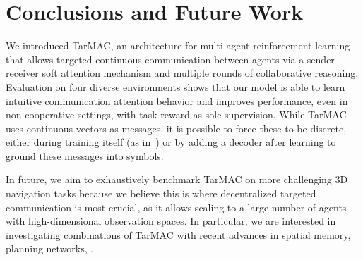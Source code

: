 \section{Conclusions and Future Work}
\label{sec:conclusions}
\vspace{1pt}

We introduced TarMAC, an architecture for multi-agent reinforcement learning that
allows targeted continuous communication between agents via a sender-receiver soft attention
mechanism and multiple rounds of collaborative reasoning. Evaluation on four
diverse environments shows that our model is able to learn intuitive communication
attention behavior and improves performance, even in non-cooperative settings,
with task reward as sole supervision. While TarMAC uses continuous vectors as messages,
it is possible to force these to be discrete, either during training itself
(as in~\citet{foerster_nips16}) or by adding a decoder after learning to ground
these messages into symbols.

In future, we aim to exhaustively benchmark TarMAC on more challenging
$3$D navigation tasks because we believe this is where decentralized targeted
communication is most crucial, as it allows scaling to a large number of agents
with high-dimensional observation spaces. In particular, we are interested
in investigating combinations of TarMAC with recent advances in spatial memory,
planning networks, \etc.

